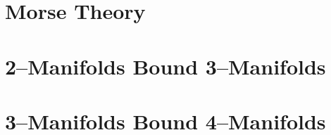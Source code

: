 \label{cha:bordisms}

\section{Morse Theory}


\section{2--Manifolds Bound 3--Manifolds}


\section{3--Manifolds Bound 4--Manifolds}


%
